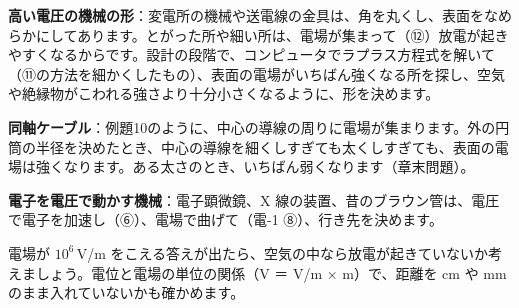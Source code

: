 \begin{phkougaku}[電場の計算と絶縁設計]
\textbf{高い電圧の機械の形}：変電所の機械や送電線の金具は、角を丸くし、表面をなめらかにしてあります。とがった所や細い所は、電場が集まって（⑫）放電が起きやすくなるからです。設計の段階で、コンピュータでラプラス方程式を解いて（⑪の方法を細かくしたもの）、表面の電場がいちばん強くなる所を探し、空気や絶縁物がこわれる強さより十分小さくなるように、形を決めます。

\textbf{同軸ケーブル}：例題10のように、中心の導線の周りに電場が集まります。外の円筒の半径を決めたとき、中心の導線を細くしすぎても太くしすぎても、表面の電場は強くなります。ある太さのとき、いちばん弱くなります（章末問題）。

\textbf{電子を電圧で動かす機械}：電子顕微鏡、X 線の装置、昔のブラウン管は、電圧で電子を加速し（⑥）、電場で曲げて（電-1 ⑧）、行き先を決めます。

\begin{phketa}[電場と電位の数の目安]
電場が $10^6$\,V/m をこえる答えが出たら、空気の中なら放電が起きていないか考えましょう。電位と電場の単位の関係（V ＝ V/m × m）で、距離を cm や mm のまま入れていないかも確かめます。
\end{phketa}
\end{phkougaku}


